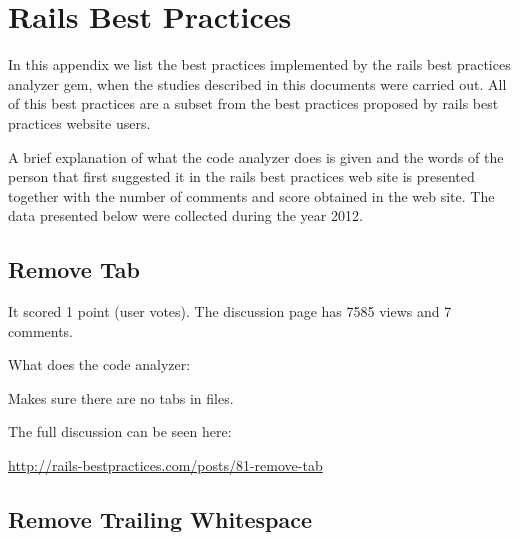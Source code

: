 \thispagestyle{empty}
\chapter{Rails Best Practices}\label{app:rails_best_practices}

In this appendix we list the best practices implemented by the rails best practices analyzer gem,
when the studies described in this documents were carried out.
All of this best practices are a subset from the best practices proposed by rails best practices website users.

A brief explanation of what the code analyzer does is given and
the words of the person that first suggested it in the rails best practices web site is presented
together with the number of comments and score obtained in the web site.
The data presented below were collected during the year 2012.

\section{Remove Tab}


It scored 1 point (user votes). 
The discussion page has 7585 views and 7 comments.

What does the code analyzer:

Makes sure there are no tabs in files.

The full discussion can be seen here:

\url{http://rails-bestpractices.com/posts/81-remove-tab}

\section{Remove Trailing Whitespace}  


